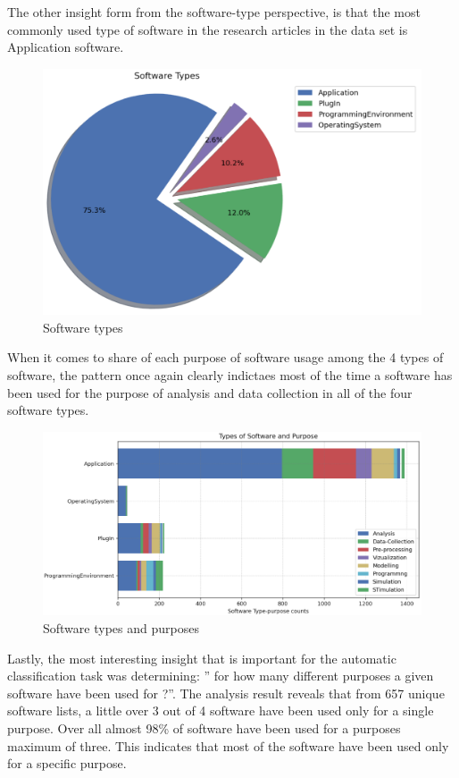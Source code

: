 The other insight form from  the software-type perspective, is that the most commonly used type of software in the research articles in the data set is Application software.  


\begin{figure}[htbp]
	\centering
	\includegraphics[width=.65\textwidth]{4.graphics/figures/analysisresults/4.Software Types pie}
	\caption{Software types}
	\label{fig:chapter03:setup}
\end{figure}

When it comes to share of each purpose of software usage among the 4 types of software, the pattern once again clearly indictaes most of the time a software has been used for the purpose of analysis and data collection in all of the four software types. 

\begin{figure}[htbp]
	\centering
	\includegraphics[width=1.1\textwidth]{4.graphics/figures/analysisresults/6.Types of Software and Purpose stacked bar}
	\caption{Software types and purposes}
	\label{fig:chapter03:setup}
\end{figure}

Lastly, the most interesting insight that is important for the automatic classification task was determining: ” for how many different purposes a given software have been used for ?”.  The analysis result reveals that from 657 unique software lists, a little over 3 out of 4 software have been used only for a single purpose. Over all almost 98\% of software have been used for a purposes maximum of three. This indicates that most of the software have been used only for a specific purpose.  

